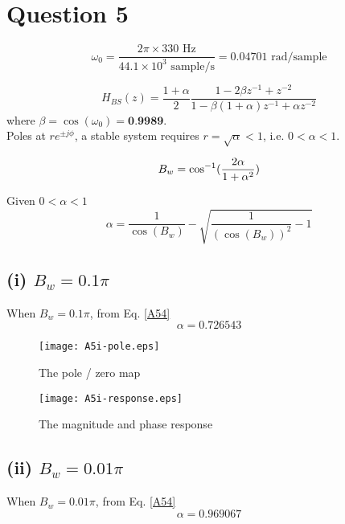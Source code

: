 \documentclass{article}
\newenvironment{homeworkProblem}[1]{
	\section*{#1}
	}{
}
\newenvironment{homeworkSection}[1]{
	\subsection*{#1}
	}{
}
\begin{document}
\begin{homeworkProblem}{Question 5}

\begin{equation}\label{A51}
\omega_0 = \frac{2\pi \times 330 \text{ Hz}}{44.1 \times 10^3 \text{ sample/s}} = 0.04701 \text{ rad/sample}
\end{equation}

\begin{equation}\label{A52}
H_{BS}(z) = \frac{1+\alpha}{2} \frac{1-2\beta z^{-1} + z^{-2}}{1 - \beta (1+\alpha) z^{-1} + \alpha z^{-2}}
\end{equation}
where $\beta = \cos(\omega_0) = \textbf{0.9989}$.\\

Poles at $r e^{\pm j\phi}$, a stable system requires $r=\sqrt{\alpha}<1$, i.e. $0<\alpha<1$.

\begin{equation}\label{A53}
B_w = \cos^{-1}(\frac{2\alpha}{1+\alpha^2})\\
\end{equation}

Given $0<\alpha<1$
\begin{equation}\label{A54}
\alpha = \frac{1}{\cos(B_w)} - \sqrt{\frac{1}{(\cos(B_w))^2}-1}
\end{equation}

\begin{homeworkSection}{(i) $B_w = 0.1\pi$}

When $B_w = 0.1\pi$, from Eq. \ref{A54}
\begin{equation}
\alpha = 0.726543
\end{equation}

\begin{figure}[H]
\begin{minipage}[t]{0.5\linewidth}
\centering
\texttt{[image: A5i-pole.eps]}
\caption{The pole / zero map}
\label{A5i-pole}
\end{minipage}
\begin{minipage}[t]{0.5\linewidth}
\centering
\texttt{[image: A5i-response.eps]}
\caption{The magnitude and phase response}
\label{A5i-response}
\end{minipage}
\end{figure}

\end{homeworkSection}

\begin{homeworkSection}{(ii) $B_w = 0.01\pi$}

When $B_w = 0.01\pi$, from Eq. \ref{A54}
\begin{equation}
\alpha = 0.969067
\end{equation}


\end{homeworkSection}
\end{homeworkProblem}
\end{document}
